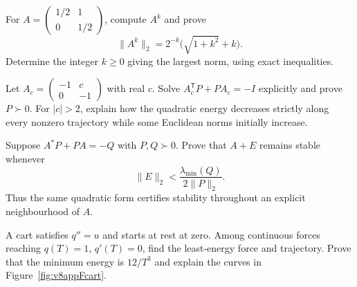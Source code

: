 \begin{exercise}[$\star\star$]\label{ex:v8cFa}
For $A=\left(\begin{smallmatrix}1/2&1\\0&1/2\end{smallmatrix}\right)$, compute $A^k$ and prove
\[\|A^k\|_2=2^{-k}\bigl(\sqrt{1+k^2}+k\bigr).
\]
Determine the integer $k\ge0$ giving the largest norm, using exact inequalities.
\end{exercise}
\begin{exercise}[$\star\star$]\label{ex:v8cFb}
Let $A_c=\left(\begin{smallmatrix}-1&c\\0&-1\end{smallmatrix}\right)$ with real $c$. Solve $A_c^{\mathsf T}P+PA_c=-I$ explicitly and prove $P\succ0$. For $|c|>2$, explain how the quadratic energy decreases strictly along every nonzero trajectory while some Euclidean norms initially increase.
\end{exercise}
\begin{exercise}[$\star\star$]\label{ex:v8cFc}
Suppose $A^*P+PA=-Q$ with $P,Q\succ0$. Prove that $A+E$ remains stable whenever
\[\|E\|_2<\frac{\lambda_{\min}(Q)}{2\|P\|_2}.
\]
Thus the same quadratic form certifies stability throughout an explicit neighbourhood of $A$.
\end{exercise}
\begin{exercise}[$\star\star$]\label{ex:v8cFd}
A cart satisfies $q''=u$ and starts at rest at zero. Among continuous forces reaching $q(T)=1$, $q'(T)=0$, find the least-energy force and trajectory. Prove that the minimum energy is $12/T^3$ and explain the curves in Figure~\ref{fig:v8appFcart}.
\end{exercise}

